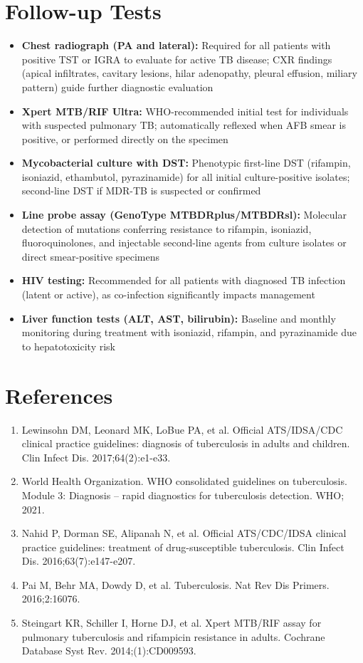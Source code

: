 \section*{Follow-up Tests}
\begin{itemize}
  \item \textbf{Chest radiograph (PA and lateral):} Required for all patients with positive TST or IGRA to evaluate for active TB disease; CXR findings (apical infiltrates, cavitary lesions, hilar adenopathy, pleural effusion, miliary pattern) guide further diagnostic evaluation
  \item \textbf{Xpert MTB/RIF Ultra:} WHO-recommended initial test for individuals with suspected pulmonary TB; automatically reflexed when AFB smear is positive, or performed directly on the specimen
  \item \textbf{Mycobacterial culture with DST:} Phenotypic first-line DST (rifampin, isoniazid, ethambutol, pyrazinamide) for all initial culture-positive isolates; second-line DST if MDR-TB is suspected or confirmed
  \item \textbf{Line probe assay (GenoType MTBDRplus/MTBDRsl):} Molecular detection of mutations conferring resistance to rifampin, isoniazid, fluoroquinolones, and injectable second-line agents from culture isolates or direct smear-positive specimens
  \item \textbf{HIV testing:} Recommended for all patients with diagnosed TB infection (latent or active), as co-infection significantly impacts management
  \item \textbf{Liver function tests (ALT, AST, bilirubin):} Baseline and monthly monitoring during treatment with isoniazid, rifampin, and pyrazinamide due to hepatotoxicity risk
\end{itemize}

\section*{References}
\begin{enumerate}
  \item Lewinsohn DM, Leonard MK, LoBue PA, et al. Official ATS/IDSA/CDC clinical practice guidelines: diagnosis of tuberculosis in adults and children. Clin Infect Dis. 2017;64(2):e1-e33.
  \item World Health Organization. WHO consolidated guidelines on tuberculosis. Module 3: Diagnosis -- rapid diagnostics for tuberculosis detection. WHO; 2021.
  \item Nahid P, Dorman SE, Alipanah N, et al. Official ATS/CDC/IDSA clinical practice guidelines: treatment of drug-susceptible tuberculosis. Clin Infect Dis. 2016;63(7):e147-e207.
  \item Pai M, Behr MA, Dowdy D, et al. Tuberculosis. Nat Rev Dis Primers. 2016;2:16076.
  \item Steingart KR, Schiller I, Horne DJ, et al. Xpert MTB/RIF assay for pulmonary tuberculosis and rifampicin resistance in adults. Cochrane Database Syst Rev. 2014;(1):CD009593.
\end{enumerate}

\clearpage

